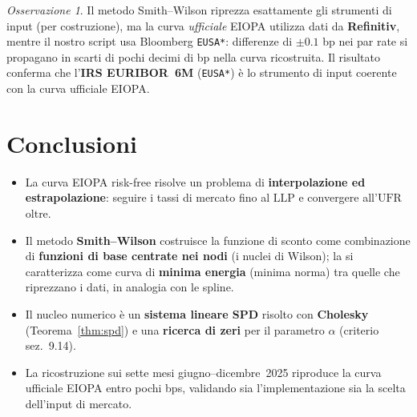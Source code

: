 \documentclass[11pt,a4paper]{article}
\theoremstyle{plain}
\theoremstyle{definition}
\theoremstyle{remark}
\newtheorem*{osservazione}{Osservazione}
\newcommand{\UFR}{\ensuremath{\mathrm{UFR}}}
\newcommand{\LLP}{\ensuremath{\mathrm{LLP}}}
\begin{document}
\begin{osservazione}
Il metodo Smith--Wilson riprezza esattamente gli strumenti di input (per costruzione),
ma la curva \emph{ufficiale} EIOPA utilizza dati da \textbf{Refinitiv}, mentre il nostro
script usa Bloomberg \texttt{EUSA*}: differenze di $\pm 0.1$ bp nei par rate si propagano
in scarti di pochi decimi di bp nella curva ricostruita. Il risultato conferma che
l'\textbf{IRS EURIBOR~6M} (\texttt{EUSA*}) \`e lo strumento di input coerente con la
curva ufficiale EIOPA.
\end{osservazione}

\section{Conclusioni}

\begin{itemize}
  \item La curva EIOPA risk-free risolve un problema di \textbf{interpolazione ed
        estrapolazione}: seguire i tassi di mercato fino al $\LLP$ e convergere all'$\UFR$ oltre.
  \item Il metodo \textbf{Smith--Wilson} costruisce la funzione di sconto come combinazione di
        \textbf{funzioni di base centrate nei nodi} (i nuclei di Wilson); la si caratterizza come curva di \textbf{minima energia}
        (minima norma) tra quelle che riprezzano i dati, in analogia con le spline.
  \item Il nucleo numerico \`e un \textbf{sistema lineare SPD} risolto con \textbf{Cholesky}
        (Teorema~\ref{thm:spd}) e una \textbf{ricerca di zeri} per il parametro $\alpha$
        (criterio sez.~9.14).
  \item La ricostruzione sui sette mesi giugno--dicembre~2025 riproduce la curva ufficiale EIOPA
        entro pochi bps, validando sia l'implementazione sia la scelta dell'input di mercato.
\end{itemize}
\end{document}
